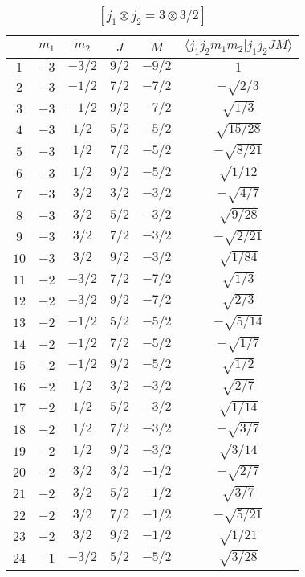 \begin{table}
\tiny
\caption{$[j_1 \otimes j_2 = 3 \otimes 3/2]$}
\begin{center}
\begin{tabular}{|c|c|c|c|c|c|}
\hline 
   & $m_1$ & $m_2$ & $J$ & $M$ & $\langle j_1 j_2 m_1 m_2 | j_1 j_2 J M \rangle$ \\ 
\hline 
$1$ & $-3$ & $-3/2$ & $9/2$ & $-9/2$ & $1$ \\ 
$2$ & $-3$ & $-1/2$ & $7/2$ & $-7/2$ & $-\sqrt{2/3}$ \\ 
$3$ & $-3$ & $-1/2$ & $9/2$ & $-7/2$ & $\sqrt{1/3}$ \\ 
$4$ & $-3$ & $1/2$ & $5/2$ & $-5/2$ & $\sqrt{15/28}$ \\ 
$5$ & $-3$ & $1/2$ & $7/2$ & $-5/2$ & $-\sqrt{8/21}$ \\ 
$6$ & $-3$ & $1/2$ & $9/2$ & $-5/2$ & $\sqrt{1/12}$ \\ 
$7$ & $-3$ & $3/2$ & $3/2$ & $-3/2$ & $-\sqrt{4/7}$ \\ 
$8$ & $-3$ & $3/2$ & $5/2$ & $-3/2$ & $\sqrt{9/28}$ \\ 
$9$ & $-3$ & $3/2$ & $7/2$ & $-3/2$ & $-\sqrt{2/21}$ \\ 
$10$ & $-3$ & $3/2$ & $9/2$ & $-3/2$ & $\sqrt{1/84}$ \\ 
$11$ & $-2$ & $-3/2$ & $7/2$ & $-7/2$ & $\sqrt{1/3}$ \\ 
$12$ & $-2$ & $-3/2$ & $9/2$ & $-7/2$ & $\sqrt{2/3}$ \\ 
$13$ & $-2$ & $-1/2$ & $5/2$ & $-5/2$ & $-\sqrt{5/14}$ \\ 
$14$ & $-2$ & $-1/2$ & $7/2$ & $-5/2$ & $-\sqrt{1/7}$ \\ 
$15$ & $-2$ & $-1/2$ & $9/2$ & $-5/2$ & $\sqrt{1/2}$ \\ 
$16$ & $-2$ & $1/2$ & $3/2$ & $-3/2$ & $\sqrt{2/7}$ \\ 
$17$ & $-2$ & $1/2$ & $5/2$ & $-3/2$ & $\sqrt{1/14}$ \\ 
$18$ & $-2$ & $1/2$ & $7/2$ & $-3/2$ & $-\sqrt{3/7}$ \\ 
$19$ & $-2$ & $1/2$ & $9/2$ & $-3/2$ & $\sqrt{3/14}$ \\ 
$20$ & $-2$ & $3/2$ & $3/2$ & $-1/2$ & $-\sqrt{2/7}$ \\ 
$21$ & $-2$ & $3/2$ & $5/2$ & $-1/2$ & $\sqrt{3/7}$ \\ 
$22$ & $-2$ & $3/2$ & $7/2$ & $-1/2$ & $-\sqrt{5/21}$ \\ 
$23$ & $-2$ & $3/2$ & $9/2$ & $-1/2$ & $\sqrt{1/21}$ \\ 
$24$ & $-1$ & $-3/2$ & $5/2$ & $-5/2$ & $\sqrt{3/28}$ \\ 

\end{tabular}
\end{center}
\end{table}
